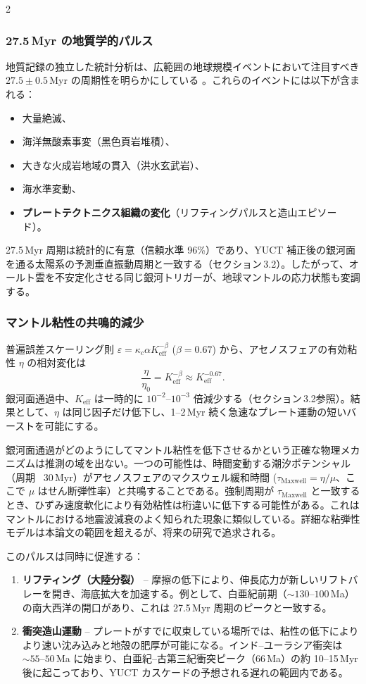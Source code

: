\documentclass[12pt,a4paper]{article}
\begin{document}
\begin{multicols}{2}
		\subsubsection{27.5 Myr の地質学的パルス}
		地質記録の独立した統計分析は、広範囲の地球規模イベントにおいて注目すべき \(27.5 \pm 0.5\) Myr の周期性を明らかにしている \cite{Rampino2021,Rampino2023}。これらのイベントには以下が含まれる：
		\begin{itemize}
			\item 大量絶滅、
			\item 海洋無酸素事変（黒色頁岩堆積）、
			\item 大きな火成岩地域の貫入（洪水玄武岩）、
			\item 海水準変動、
			\item \textbf{プレートテクトニクス組織の変化}（リフティングパルスと造山エピソード）。
		\end{itemize}
		27.5 Myr 周期は統計的に有意（信頼水準 96\%）であり、YUCT 補正後の銀河面を通る太陽系の予測垂直振動周期と一致する（セクション 3.2）。したがって、オールト雲を不安定化させる同じ銀河トリガーが、地球マントルの応力状態も変調する。
		
		\subsubsection{マントル粘性の共鳴的減少}
		普遍誤差スケーリング則 \(\varepsilon = \kappa_c \alpha K_{\mathrm{eff}}^{-\beta}\) (\(\beta=0.67\)) から、アセノスフェアの有効粘性 \(\eta\) の相対変化は
		\[
		\frac{\eta}{\eta_0} = K_{\mathrm{eff}}^{-\beta} \approx K_{\mathrm{eff}}^{-0.67}.
		\]
		銀河面通過中、\(K_{\mathrm{eff}}\) は一時的に \(10^{-2}\)–\(10^{-3}\) 倍減少する（セクション 3.2参照）。結果として、\(\eta\) は同じ因子だけ低下し、1–2 Myr 続く急速なプレート運動の短いバーストを可能にする。
		
		銀河面通過がどのようにしてマントル粘性を低下させるかという正確な物理メカニズムは推測の域を出ない。一つの可能性は、時間変動する潮汐ポテンシャル（周期 ~30 Myr）がアセノスフェアのマクスウェル緩和時間 (\(\tau_{\mathrm{Maxwell}} = \eta/\mu\)、ここで \(\mu\) はせん断弾性率）と共鳴することである。強制周期が \(\tau_{\mathrm{Maxwell}}\) と一致するとき、ひずみ速度軟化により有効粘性は桁違いに低下する可能性がある。これはマントルにおける地震波減衰のよく知られた現象に類似している。詳細な粘弾性モデルは本論文の範囲を超えるが、将来の研究で追求される。
		
		このパルスは同時に促進する：
		\begin{enumerate}
			\item \textbf{リフティング（大陸分裂）} – 摩擦の低下により、伸長応力が新しいリフトバレーを開き、海底拡大を加速する。例として、白亜紀前期（\(\sim 130\)–\(100\) Ma）の南大西洋の開口があり、これは 27.5 Myr 周期のピークと一致する。
			\item \textbf{衝突造山運動} – プレートがすでに収束している場所では、粘性の低下によりより速い沈み込みと地殻の肥厚が可能になる。インド–ユーラシア衝突は \(\sim 55\)–\(50\) Ma に始まり、白亜紀–古第三紀衝突ピーク（66 Ma）の約 10–15 Myr 後に起こっており、YUCT カスケードの予想される遅れの範囲内である。
		\end{enumerate}
		

\end{multicols}
\end{document}
